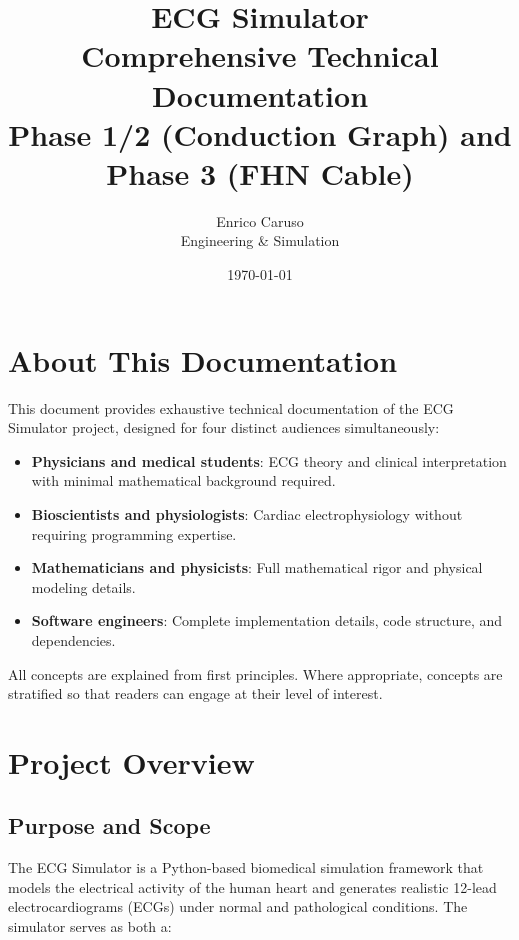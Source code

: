 \documentclass[12pt,a4paper,oneside]{book}
\title{\Large \textbf{ECG Simulator}\\
        \large Comprehensive Technical Documentation\\
        \normalsize Phase 1/2 (Conduction Graph) and Phase 3 (FHN Cable)}
\author{Enrico Caruso\\Engineering \& Simulation}
\date{\today}
\begin{document}
\frontmatter

\maketitle

\tableofcontents
\listoffigures
\listoftables

\chapter*{About This Documentation}

This document provides exhaustive technical documentation of the ECG Simulator project, designed for four distinct audiences simultaneously:

\begin{itemize}
    \item \textbf{Physicians and medical students}: ECG theory and clinical interpretation with minimal mathematical background required.
    \item \textbf{Bioscientists and physiologists}: Cardiac electrophysiology without requiring programming expertise.
    \item \textbf{Mathematicians and physicists}: Full mathematical rigor and physical modeling details.
    \item \textbf{Software engineers}: Complete implementation details, code structure, and dependencies.
\end{itemize}

\noindent All concepts are explained from first principles. Where appropriate, concepts are stratified so that readers can engage at their level of interest.

\mainmatter

\chapter{Project Overview}

\section{Purpose and Scope}

The ECG Simulator is a Python-based biomedical simulation framework that models the electrical activity of the human heart and generates realistic 12-lead electrocardiograms (ECGs) under normal and pathological conditions. The simulator serves as both a:
\end{document}
